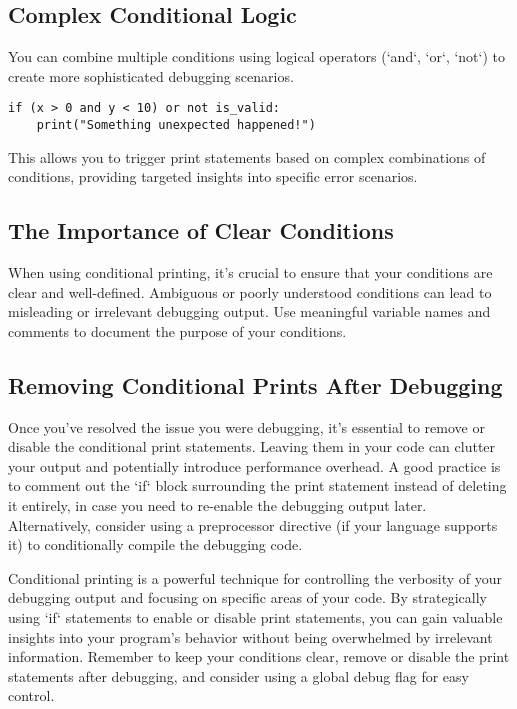 \documentclass{article}
\begin{document}
{{{\subsection*{Complex Conditional Logic}

You can combine multiple conditions using logical operators (`and`, `or`, `not`) to create more sophisticated debugging scenarios.

\begin{verbatim}
if (x > 0 and y < 10) or not is_valid:
    print("Something unexpected happened!")
\end{verbatim}

This allows you to trigger print statements based on complex combinations of conditions, providing targeted insights into specific error scenarios.

\subsection*{The Importance of Clear Conditions}

When using conditional printing, it's crucial to ensure that your conditions are clear and well-defined. Ambiguous or poorly understood conditions can lead to misleading or irrelevant debugging output.  Use meaningful variable names and comments to document the purpose of your conditions.

\subsection*{Removing Conditional Prints After Debugging}

Once you've resolved the issue you were debugging, it's essential to remove or disable the conditional print statements. Leaving them in your code can clutter your output and potentially introduce performance overhead.  A good practice is to comment out the `if` block surrounding the print statement instead of deleting it entirely, in case you need to re-enable the debugging output later.  Alternatively, consider using a preprocessor directive (if your language supports it) to conditionally compile the debugging code.

Conditional printing is a powerful technique for controlling the verbosity of your debugging output and focusing on specific areas of your code. By strategically using `if` statements to enable or disable print statements, you can gain valuable insights into your program's behavior without being overwhelmed by irrelevant information. Remember to keep your conditions clear, remove or disable the print statements after debugging, and consider using a global debug flag for easy control.

}}}
\end{document}

